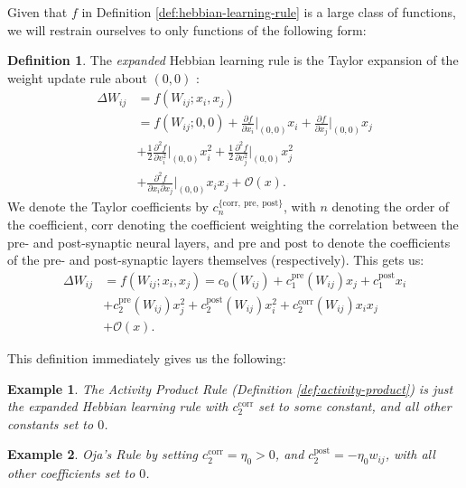 \documentclass{article}
\newtheorem{example}{Example}[subsection]
\theoremstyle{definition}
\newtheorem{definition}{Definition}[subsection]
\begin{document}
Given that $f$ in
Definition \ref{def:hebbian-learning-rule} is a large class of functions,
we will restrain ourselves to only functions of the following form:
\begin{definition}\label{def:expanded-learning}
  The \textit{expanded} Hebbian learning rule is the Taylor expansion
  of the weight update rule about $(0, 0)$
  \parencite{gerstner_mathematical_2002}:
  \begin{align*}
    \Delta W_{ij} &= f(W_{ij}; x_i, x_j) \\
    &= f(W_{ij}; 0, 0) + \frac{\partial f}{\partial x_i} \big|_{(0,
    0)} x_i + \frac{\partial f}{\partial x_j}
    \big|_{(0, 0)} x_j \\
    &+ \frac{1}{2} \frac{\partial^2 f}{\partial v^2_i} \big|_{(0, 0)}
    x_i^2 + \frac{1}{2} \frac{\partial^2 f}{\partial v^2_j}\big|_{(0,
    0)} x_j^2 \\
    &+ \frac{\partial^2 f}{\partial x_i \partial x_j}\big|_{(0, 0)}
    x_i x_j + \mathcal{O}(x).
  \end{align*}
  We denote the Taylor coefficients by
  $c_n^{\{\text{corr},~\text{pre},~\text{post}\}}$, with
  $n$ denoting the order of the coefficient, $\text{corr}$ denoting
  the coefficient
  weighting the correlation between the pre- and post-synaptic neural
  layers, and
  $\text{pre}$ and $\text{post}$ to denote the coefficients of the
  pre- and post-synaptic
  layers themselves (respectively).
  This gets us:
  \begin{align*}
    \Delta W_{ij} &= f(W_{ij}; x_i, x_j) =
    c_0 (W_{ij}) + c_1^\text{pre} (W_{ij}) x_j + c_1^\text{post} x_i \\
    &+ c_2^\text{pre} (W_{ij}) x_j^2 + c_2^\text{post} (W_{ij}) x_i^2
    + c_2^\text{corr} (W_{ij}) x_i x_j \\
    &+ \mathcal{O} (x).
  \end{align*}
\end{definition}

This definition immediately gives us the following:
\begin{example}
  The Activity Product Rule (Definition \ref{def:activity-product}) is
  just the expanded Hebbian learning rule with $c_2^\text{corr}$
  set to some constant, and all other constants set to $0$.
\end{example}

\begin{example}
  \textit{Oja's Rule} \parencite{oja_simplified_1982}
  by setting $c_2^\text{corr} = \eta_0 > 0$,
  and $c_2^\text{post} = - \eta_0 w_{ij}$, with all other
  coefficients set to $0$.
\end{example}
\end{document}
